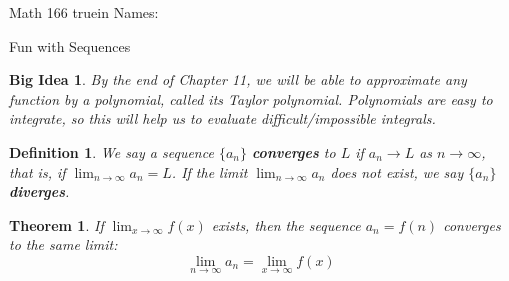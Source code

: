 \documentclass[12pt]{article}
\newtheorem*{theorem}{Theorem}
\newtheorem*{bigidea}{Big Idea}
\newtheorem*{defn}{Definition}
\begin{document}
\thispagestyle{empty} %

\noindent
{Math 166  truein  Names:\ \hrulefill}


\noindent
{Fun with Sequences }

\begin{bigidea} \rm
By the end of Chapter 11, we will be able to approximate \emph{any function} by a polynomial, called its \emph{Taylor polynomial}. Polynomials are easy to integrate, so this will help us to evaluate difficult/impossible integrals.
\end{bigidea}



\begin{defn} \rm
We say a sequence $\{a_n\}$ \textbf{converges} to $L$ if $a_n\rightarrow L$ as $n\rightarrow\infty$, that is, if $\displaystyle\lim_{n\rightarrow\infty} a_n=L$. If the limit $\displaystyle\lim_{n\rightarrow\infty} a_n$ does not exist, we say $\{a_n\}$ \textbf{diverges}.
\end{defn}

\begin{theorem}
If $\displaystyle\lim_{x\rightarrow\infty}f(x)$ exists, then the sequence $a_n=f(n)$ converges to the same limit: \[\displaystyle\lim_{n\rightarrow\infty}a_n=\displaystyle\lim_{x\rightarrow\infty}f(x)\]
\end{theorem}
\end{document}
